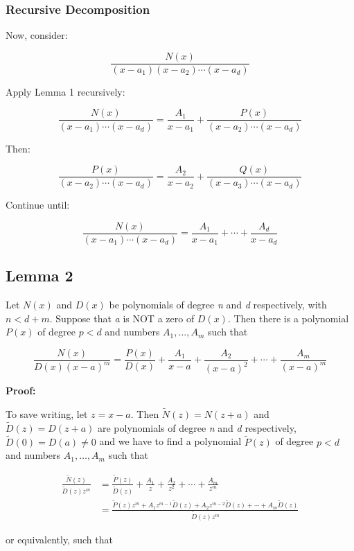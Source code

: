 \subsubsection{Recursive Decomposition}

Now, consider:

\[
    \frac{N(x)}{(x - a_1)(x - a_2)\cdots(x - a_d)}
\]

Apply Lemma 1 recursively:

\[
    \frac{N(x)}{(x - a_1)\cdots(x - a_d)} = \frac{A_1}{x - a_1} + \frac{P(x)}{(x - a_2)\cdots(x - a_d)}
\]

Then:

\[
    \frac{P(x)}{(x - a_2)\cdots(x - a_d)} = \frac{A_2}{x - a_2} + \frac{Q(x)}{(x - a_3)\cdots(x - a_d)}
\]

Continue until:

\[
    \frac{N(x)}{(x - a_1)\cdots(x - a_d)} = \frac{A_1}{x - a_1} + \cdots + \frac{A_d}{x - a_d}
\]

\subsection{Lemma 2}

Let \(N(x)\) and \(D(x)\) be polynomials of degree \emph{n} and \emph{d} respectively, with \(n < d + m\).
Suppose that \emph{a} is NOT a zero of \(D(x)\). Then there is a polynomial \(P(x)\) of degree \(p < d\) and
numbers \(A_1, \dots, A_m\) such that

\[
    \frac{N(x)}{D(x) {(x-a)}^m} = \frac{P(x)}{D(x)} + \frac{A_1}{x-a} + \frac{A_2}{{(x-a)}^2} + \cdots + 
    \frac{A_m}{{(x-a)}^m}
\]

\textbf{Proof:} 

To save writing, let \(z = x - a\). Then \(\tilde{N}(z) = N(z + a)\) and \(\tilde{D}(z) = D(z + a)\)
are polynomials of degree \emph{n} and \emph{d} respectively, \(\tilde{D}(0) = D(a) \neq 0\) and we have to find a
polynomial \(\tilde{P}(z)\) of degree \(p < d\) and numbers \(A_1, \dots, A_m\) such that

\begin{align*}
    \frac{\tilde{N}(z)}{\tilde{D}(z) z^m} &= \frac{\tilde{P}(z)}{\tilde{D}(z)} + \frac{A_1}{z} + \frac{A_2}{z^2} + \cdots + \frac{A_m}{z^m} \\
    &= \frac{\tilde{P}(z) z^m + A_1 z^{m-1} \tilde{D}(z) + A_2 z^{m-2} \tilde{D}(z) + \cdots + A_m \tilde{D}(z)}{\tilde{D}(z) z^m}
\end{align*}

or equivalently, such that

